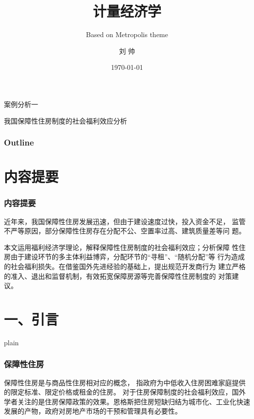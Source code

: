 \documentclass[aspectratio=169, 12pt]{beamer}
\title{计量经济学}
\subtitle{Based on Metropolis theme}
\author[LIU ShHUAI]{刘 {  } 帅}
\institute{山西师范大学 {  } 经济与管理学院}
\date{\today}
\begin{document}
\maketitle

\begin{frame}[standout]
    案例分析一\par
    \addtolength{\parskip}{.4em}
    我国保障性住房制度的社会福利效应分析
\end{frame}

\begin{frame}[plain]
    \frametitle{Outline}
    \tableofcontents[hideallsubsections]
  \end{frame}

\section{内容提要}

\begin{frame}[plain]
    \frametitle{内容提要}
    近年来，我国保障性住房发展迅速，但由于建设速度过快，投入资金不足，
监管不严等原因，部分保障性住房存在分配不公、空置率过高、建筑质量差等问
题。\par
本文运用福利经济学理论，解释保障性住房制度的社会福利效应；分析保障
性住房由于建设环节的多主体利益博弈，分配环节的“寻租”、“随机分配”等
行为造成的社会福利损失。在借鉴国外先进经验的基础上，提出规范开发商行为
建立严格的准入、退出和监督机制，有效拓宽保障房源等完善保障性住房制度的
对策建议。
\end{frame}

\section{一、引言}

\begin{frame}{plain}
    \frametitle{保障性住房}
    保障性住房是与商品性住房相对应的概念，
    指政府为中低收入住房困难家庭提供的限定标准、限定价格或租金的住房。
    对于住房保障制度的社会福利效应，国外学者关注的是住房保障政策的效果。恩格斯把住房短缺归结为城市化、工业化快速发展的产物，政府对房地产市场的干预和管理具有必要性。
\end{frame}
\end{document}
